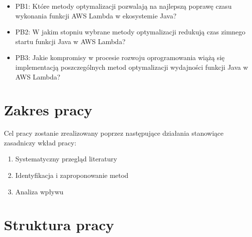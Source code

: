 \begin{itemize}
    \item PB1: Które metody optymalizacji pozwalają na najlepszą poprawę czasu wykonania funkcji AWS Lambda w ekosystemie Java?
    \item PB2: W jakim stopniu wybrane metody optymalizacji redukują czas zimnego startu funkcji Java w AWS Lambda?
    \item PB3: Jakie kompromisy w procesie rozwoju oprogramowania wiążą się implementacją poszczególnych metod optymalizacji wydajności funkcji Java w AWS Lambda?
\end{itemize}

\section*{Zakres pracy}\label{chapter:zakres_pracy}

Cel pracy zostanie zrealizowany poprzez następujące działania stanowiące zasadniczy wkład pracy:
\begin{enumerate}
    \item Systematyczny przegląd literatury
    \item Identyfikacja i zaproponowanie metod
    \item Analiza wpływu
\end{enumerate}

\section*{Struktura pracy}\label{chapter:struktura_pracy}
